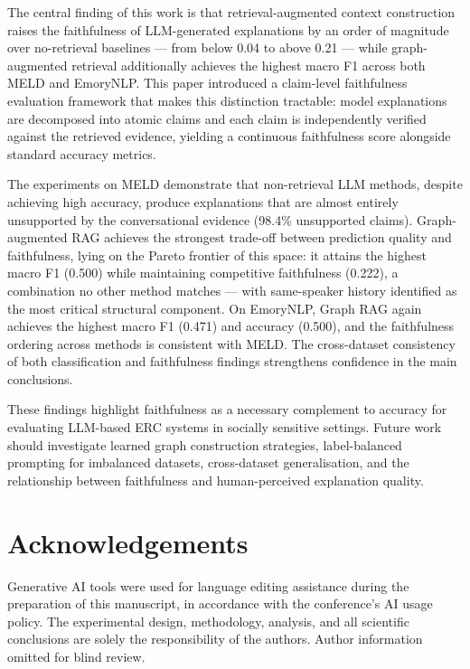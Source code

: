\documentclass[runningheads]{llncs}
\begin{document}
The central finding of this work is that retrieval-augmented context
construction raises the faithfulness of LLM-generated explanations by
an order of magnitude over no-retrieval baselines — from below 0.04 to
above 0.21 — while graph-augmented retrieval additionally achieves the
highest macro F1 across both MELD and EmoryNLP. This paper introduced
a claim-level faithfulness evaluation framework that makes this
distinction tractable: model explanations are decomposed into atomic
claims and each claim is independently verified against the retrieved
evidence, yielding a continuous faithfulness score alongside standard
accuracy metrics.

The experiments on MELD demonstrate that non-retrieval LLM methods,
despite achieving high accuracy, produce explanations that are almost
entirely unsupported by the conversational evidence (98.4\% unsupported
claims). Graph-augmented RAG achieves the strongest trade-off between prediction
quality and faithfulness, lying on the Pareto frontier of this space:
it attains the highest macro F1 (0.500) while maintaining competitive
faithfulness (0.222), a combination no other method matches — with
same-speaker history identified as the most critical structural component. On EmoryNLP, Graph RAG again achieves the highest macro F1 (0.471) and
accuracy (0.500), and the faithfulness ordering across methods is
consistent with MELD. The cross-dataset consistency of both classification
and faithfulness findings strengthens confidence in the main conclusions.

These findings highlight faithfulness as a necessary complement to
accuracy for evaluating LLM-based ERC systems in socially sensitive
settings. Future work should investigate learned graph construction
strategies, label-balanced prompting for imbalanced datasets,
cross-dataset generalisation, and the relationship between faithfulness
and human-perceived explanation quality.

\section*{Acknowledgements}
Generative AI tools were used for language editing assistance during the
preparation of this manuscript, in accordance with the conference's AI
usage policy. The experimental design, methodology, analysis, and all
scientific conclusions are solely the responsibility of the authors. Author information omitted for blind review.



\end{document}
